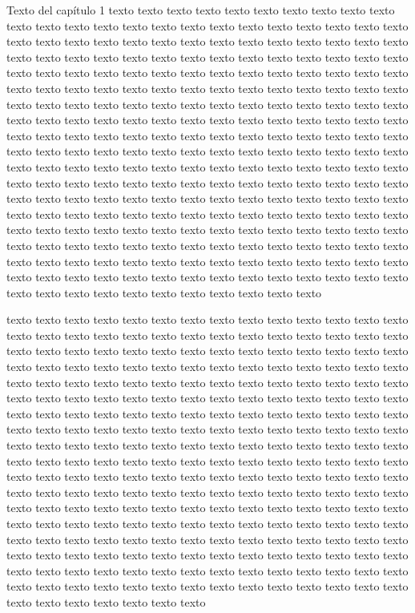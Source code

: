 Texto del capítulo 1
texto texto texto texto texto texto texto texto 
texto texto texto texto texto texto texto texto
texto texto texto texto texto texto texto texto
texto texto texto texto texto texto texto texto 
texto texto texto texto texto texto texto texto
texto texto texto texto texto texto texto texto
texto texto texto texto texto texto texto texto 
texto texto texto texto texto texto texto texto
texto texto texto texto texto texto texto texto
texto texto texto texto texto texto texto texto 
texto texto texto texto texto texto texto texto
texto texto texto texto texto texto texto texto
texto texto texto texto texto texto texto texto 
texto texto texto texto texto texto texto texto
texto texto texto texto texto texto texto texto
texto texto texto texto texto texto texto texto 
texto texto texto texto texto texto texto texto
texto texto texto texto texto texto texto texto
texto texto texto texto texto texto texto texto 
texto texto texto texto texto texto texto texto
texto texto texto texto texto texto texto texto
texto texto texto texto texto texto texto texto 
texto texto texto texto texto texto texto texto
texto texto texto texto texto texto texto texto
texto texto texto texto texto texto texto texto 
texto texto texto texto texto texto texto texto
texto texto texto texto texto texto texto texto
texto texto texto texto texto texto texto texto 
texto texto texto texto texto texto texto texto
texto texto texto texto texto texto texto texto
texto texto texto texto texto texto texto texto 
texto texto texto texto texto texto texto texto
texto texto texto 

texto texto texto texto texto texto texto texto 
texto texto texto texto texto texto texto texto
texto texto texto texto texto texto texto texto
texto texto texto texto texto texto texto texto 
texto texto texto texto texto texto texto texto
texto texto texto texto texto texto texto texto
texto texto texto texto texto texto texto texto 
texto texto texto texto texto texto texto texto
texto texto texto texto texto texto texto texto
texto texto texto texto texto texto texto texto 
texto texto texto texto texto texto texto texto
texto texto texto texto texto texto texto texto
texto texto texto texto texto texto texto texto 
texto texto texto texto texto texto texto texto
texto texto texto texto texto texto texto texto
texto texto texto texto texto texto texto texto 
texto texto texto texto texto texto texto texto
texto texto texto texto texto texto texto texto
texto texto texto texto texto texto texto texto 
texto texto texto texto texto texto texto texto
texto texto texto texto texto texto texto texto
texto texto texto texto texto texto texto texto 
texto texto texto texto texto texto texto texto
texto texto texto texto texto texto texto texto
texto texto texto texto texto texto texto texto 
texto texto texto texto texto texto texto texto
texto texto texto texto texto texto texto texto
texto texto texto texto texto texto texto texto 
texto texto texto texto texto texto texto texto
texto texto texto texto texto texto texto texto
texto texto texto texto texto texto texto texto 
texto texto texto texto texto texto texto texto
texto texto texto 
